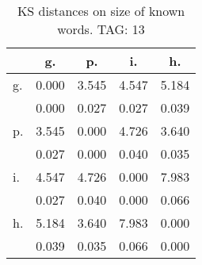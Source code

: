 \begin{table}[h!]
\begin{center}
\begin{tabular}{| l | c | c | c | c |}\hline
 & g. & p. & i. & h. \\\hline
g. & 0.000  & 3.545  & 4.547  & 5.184 \\\hline
 & 0.000  & 0.027  & 0.027  & 0.039 \\\hline
p. & 3.545  & 0.000  & 4.726  & 3.640 \\\hline
 & 0.027  & 0.000  & 0.040  & 0.035 \\\hline
i. & 4.547  & 4.726  & 0.000  & 7.983 \\\hline
 & 0.027  & 0.040  & 0.000  & 0.066 \\\hline
h. & 5.184  & 3.640  & 7.983  & 0.000 \\\hline
 & 0.039  & 0.035  & 0.066  & 0.000 \\\hline
\end{tabular}
\caption{KS distances on size of known words. TAG: 13}
\end{center}
\end{table}